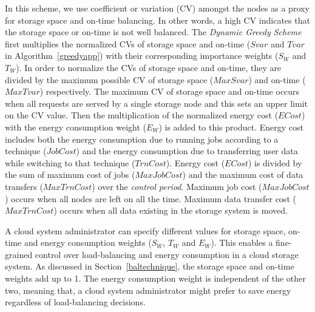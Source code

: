 In this scheme, we use coefficient or variation (CV) amongst the nodes as a proxy for storage space
and on-time balancing.
In other words, a high CV indicates that the storage
space or on-time is not well balanced.
The \textit{Dynamic Greedy Scheme} first multiplies the normalized CVs of storage space
and on-time ($Svar$ and $Tvar$ in Algorithm~\ref{greedyapp}) with their corresponding importance
weights ($S_W$ and $T_W$). In order to normalize the CVs of storage space and on-time, they are
divided by the maximum possible CV of storage space ($MaxSvar$) and on-time
($MaxTvar$) respectively. The maximum CV of storage space and on-time occurs when all requests
are served by a single storage node and this sets an upper limit on the CV value. Then the multiplication
of the normalized energy cost ($ECost$) with the energy consumption weight ($E_W$) is added to this product. Energy
cost includes both the energy consumption due to running jobs according to a technique ($JobCost$) and the energy
consumption due to transferring user data while switching to that technique ($TrnCost$). Energy cost ($ECost$) is
divided by the sum of maximum cost of jobs ($MaxJobCost$) and the maximum cost of data transfers ($MaxTrnCost$) over the 
\textit{control period}. Maximum job cost ($MaxJobCost$) occurs when all nodes are left on all the time. Maximum data
transfer cost ($MaxTrnCost$) occurs when all data existing in the storage system is moved.

A cloud system administrator can specify different values for storage space, on-time and energy consumption
weights ($S_W$, $T_W$ and $E_W$). This enables a fine-grained control over load-balancing and energy consumption
in a cloud storage system. As discussed in Section~\ref{baltechnique}, the storage space
and on-time weights add up to 1. The energy consumption weight is independent of the other two, meaning that,
a cloud system administrator might prefer to save energy regardless of load-balancing decisions. 

